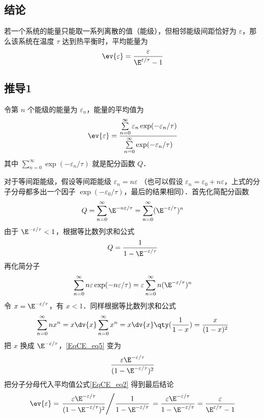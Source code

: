 

\subsection{结论}
若一个系统的能量只能取一系列离散的值（能级），但相邻能级间距恰好为 $\varepsilon$，那么该系统在温度 $\tau$ 达到热平衡时，平均能量为
\begin{equation}
\ev{\varepsilon} = \frac{\varepsilon}{\E^{\varepsilon/\tau} - 1}
\end{equation}

\subsection{推导1}
令第 $n$ 个能级的能量为 $\varepsilon_n$，能量的平均值为
\begin{equation}\label{EqCE_eq2}
\ev{\varepsilon} = \frac{\sum\limits_{n = 0}^\infty  \varepsilon_n \exp(-\varepsilon_n/\tau)}{\sum\limits_{n = 0}^\infty \exp(-\varepsilon_n/\tau)}
\end{equation}
其中 $\sum\limits_{n = 0}^\infty \exp(-\varepsilon_n/\tau)$ 就是配分函数 $Q$．

对于等间距能级，假设等间距能级 $\varepsilon_n = n\varepsilon$ （也可以假设 $\varepsilon_n = \varepsilon_0 + n\varepsilon $，上式的分子分母都多出一个因子 $\exp(-\varepsilon_0/\tau)$，最后的结果相同）．首先化简配分函数
\begin{equation}
Q = \sum_{n = 0}^\infty \E^{-n\varepsilon /\tau}  = \sum_{n = 0}^\infty (\E^{-\varepsilon/\tau})^n
\end{equation}
由于 $\E^{-\varepsilon/\tau} < 1$，根据等比数列求和公式 %
\begin{equation}\label{EqCE_eq4}
Q = \frac{1}{1 - \E^{-\varepsilon /\tau}}
\end{equation}
再化简分子
\begin{equation}\label{EqCE_eq5}
\sum_{n = 0}^\infty  n\varepsilon \exp(-n\varepsilon /\tau)  = \varepsilon \sum_{n = 0}^\infty  n(\E^{-\varepsilon/\tau})^n
\end{equation}
令 $x = \E^{-\varepsilon/\tau}$，有 $x < 1$．同样根据等比数列求和公式
\begin{equation}
\sum_{n = 0}^\infty  n x^n = x\dv{x}\sum_{n = 0}^\infty x^n = x\dv{x} \qty(\frac{1}{1 - x}) = \frac{x}{(1 - x)^2}
\end{equation}
把 $x$ 换成 $\E^{-\varepsilon/\tau}$，\autoref{EqCE_eq5} 变为
\begin{equation}
\frac{\varepsilon \E^{-\varepsilon/\tau}}{(1 - \E^{-\varepsilon/\tau})^2}
\end{equation}
把分子分母代入平均值公式\autoref{EqCE_eq2} 得到最后结论
\begin{equation}
\ev{\varepsilon} = \left. \frac{\varepsilon \E^{-\varepsilon/\tau}}{(1 - \E^{-\varepsilon/\tau})^2} \middle/ \frac{1}{1 - \E^{-\varepsilon/\tau}}  \right. = \frac{\varepsilon \E^{-\varepsilon/\tau}}{1 - \E^{-\varepsilon/\tau}} = \frac{\varepsilon}{\E^{\varepsilon/\tau} - 1}
\end{equation}

